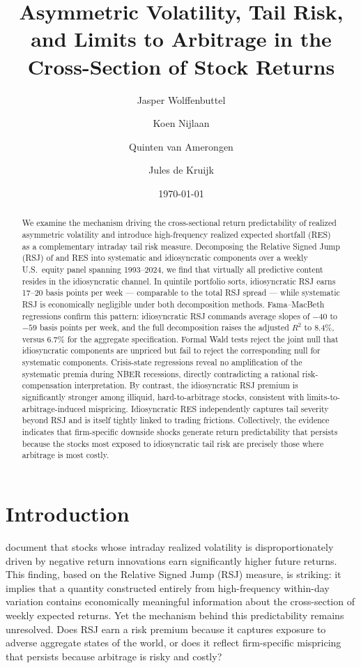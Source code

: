 \documentclass[11pt,a4paper]{article}
\title{Asymmetric Volatility, Tail Risk, and Limits to Arbitrage in the Cross-Section of Stock Returns}
\author{Jasper Wolffenbuttel \and Koen Nijlaan \and Quinten van Amerongen \and Jules de Kruijk}
\date{\today}
\begin{document}
\maketitle

\begin{abstract}
We examine the mechanism driving the cross-sectional return predictability of realized
asymmetric volatility and introduce high-frequency realized expected shortfall (RES) as a
complementary intraday tail risk measure. Decomposing the Relative Signed Jump (RSJ) of
\citet{bollerslev2020} and RES into systematic and idiosyncratic components over a weekly
U.S.\ equity panel spanning 1993--2024, we find that virtually all predictive content
resides in the idiosyncratic channel. In quintile portfolio sorts, idiosyncratic RSJ earns
17--20 basis points per week --- comparable to the total RSJ spread --- while systematic RSJ
is economically negligible under both decomposition methods. Fama--MacBeth regressions
confirm this pattern: idiosyncratic RSJ commands average slopes of $-40$ to $-59$ basis
points per week, and the full decomposition raises the adjusted $R^2$ to 8.4\%,
versus 6.7\% for the aggregate specification. Formal Wald tests reject the joint null
that idiosyncratic components are unpriced but fail to reject the corresponding null for
systematic components. Crisis-state regressions reveal no amplification of the systematic
premia during NBER recessions, directly contradicting a rational risk-compensation
interpretation. By contrast, the idiosyncratic RSJ premium is significantly stronger
among illiquid, hard-to-arbitrage stocks, consistent with limits-to-arbitrage-induced
mispricing. Idiosyncratic RES independently captures tail severity beyond RSJ and is
itself tightly linked to trading frictions. Collectively, the evidence indicates that
firm-specific downside shocks generate return predictability that persists because
the stocks most exposed to idiosyncratic tail risk are precisely those where arbitrage
is most costly.
\end{abstract}

\newpage
\section{Introduction}
 
\citet{bollerslev2020} document that stocks whose intraday realized volatility is disproportionately driven by negative return innovations earn significantly higher future returns. This finding, based on the Relative Signed Jump (RSJ) measure, is striking: it implies that a quantity constructed entirely from high-frequency within-day variation contains economically meaningful information about the cross-section of weekly expected returns. Yet the mechanism behind this predictability remains unresolved. Does RSJ earn a risk premium because it captures exposure to adverse aggregate states of the world, or does it reflect firm-specific mispricing that persists because arbitrage is risky and costly?
 
\end{document}
